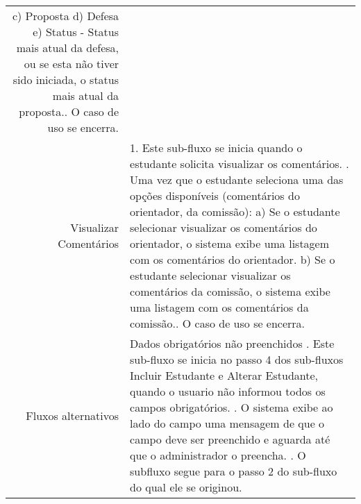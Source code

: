\begin{longtable}{r p{12cm}}
                     \hspace*{1cm} c) Proposta\newline
                     \hspace*{1cm} d) Defesa\newline
                     \hspace*{1cm} e) Status - Status mais atual da defesa, ou se esta não tiver sido iniciada, o status mais atual da proposta.\newline
                     3. O caso de uso se encerra.\newline     \\ 
Visualizar Comentários & 1. Este sub-fluxo se inicia quando o estudante solicita visualizar os comentários. \newline
                     2. Uma vez que o estudante seleciona uma das opções disponíveis (comentários do orientador, da comissão):\newline
                     \hspace*{1cm} a) Se o estudante selecionar visualizar os comentários do orientador, o sistema exibe uma listagem com os comentários do orientador.\newline
                     \hspace*{1cm} b) Se o estudante selecionar visualizar os comentários da comissão, o sistema exibe uma listagem com os comentários da comissão.\newline
                     3. O caso de uso se encerra.\newline                                        
               \\ \hline
Fluxos alternativos & Dados obrigatórios não preenchidos  \newline
                        1. Este sub-fluxo se inicia no passo 4 dos sub-fluxos Incluir Estudante e Alterar Estudante, quando o usuario não informou todos os campos obrigatórios. \newline
                        2. O sistema exibe ao lado do campo uma mensagem de que o campo deve ser preenchido e aguarda até que o administrador o preencha. \newline
                        3. O subfluxo segue para o passo 2 do sub-fluxo do qual ele se originou. \newline
                    \\ \hline        
\end{longtable}





